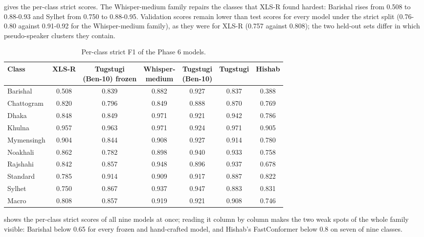  gives the per-class strict scores. The Whisper-medium
family repairs the classes that XLS-R found hardest: Barishal rises from 0.508
to 0.88-0.93 and Sylhet from 0.750 to 0.88-0.95. Validation scores remain
lower than test scores for every model under the strict split (0.76-0.80
against 0.91-0.92 for the Whisper-medium family), as they were for XLS-R
(0.757 against 0.808); the two held-out sets differ in which pseudo-speaker
clusters they contain.

\begin{table}[ht]
  \centering
  \caption{Per-class strict F1 of the Phase 6 models.}
  \label{tab:encoders-perclass}
  \small
  \begin{tabular}{lcccccc}
    \toprule
    Class & XLS-R & \makecell{Tugstugi\\(Ben-10) frozen} & \makecell{Whisper-\\medium} & \makecell{Tugstugi\\(Ben-10)} & Tugstugi & Hishab \\
    \midrule
    Barishal   & 0.508 & 0.839 & 0.882 & 0.927 & 0.837 & 0.388 \\
    Chattogram & 0.820 & 0.796 & 0.849 & 0.888 & 0.870 & 0.769 \\
    Dhaka      & 0.848 & 0.849 & 0.971 & 0.921 & 0.942 & 0.786 \\
    Khulna     & 0.957 & 0.963 & 0.971 & 0.924 & 0.971 & 0.905 \\
    Mymensingh & 0.904 & 0.844 & 0.908 & 0.927 & 0.914 & 0.780 \\
    Noakhali   & 0.862 & 0.782 & 0.898 & 0.940 & 0.933 & 0.758 \\
    Rajshahi   & 0.842 & 0.857 & 0.948 & 0.896 & 0.937 & 0.678 \\
    Standard   & 0.785 & 0.914 & 0.909 & 0.917 & 0.887 & 0.822 \\
    Sylhet     & 0.750 & 0.867 & 0.937 & 0.947 & 0.883 & 0.831 \\
    \midrule
    Macro      & 0.808 & 0.857 & 0.919 & 0.921 & 0.908 & 0.746 \\
    \bottomrule
  \end{tabular}
\end{table}

 shows the per-class strict scores of all nine
models at once; reading it column by column makes the two weak spots of the
whole family visible: Barishal below 0.65 for every frozen and hand-crafted
model, and Hishab's FastConformer below 0.8 on seven of nine classes.

